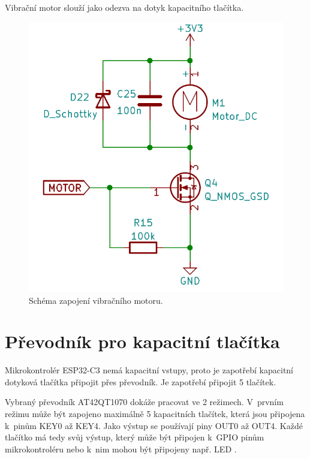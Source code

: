 Vibrační motor slouží jako odezva na dotyk kapacitního tlačítka. 

\begin{figure}[!h]
  \begin{center}
    \includegraphics[scale=0.4]{obrazky/Vibracni_motor.png}
  \end{center}
  \caption[Schéma zapojení vibračního motoru]{Schéma zapojení vibračního motoru.}
\end{figure}

\section{Převodník pro kapacitní tlačítka}
Mikrokontrolér ESP32-C3 nemá kapacitní vstupy, proto je zapotřebí kapacitní dotyková tlačítka připojit přes převodník. Je zapotřebí připojit 
5 tlačítek. 

Vybraný převodník AT42QT1070 dokáže pracovat ve 2 režimech. V~prvním režimu může být zapojeno maximálně 5 kapacitních tlačítek, která jsou připojena
k~pinům KEY0 až KEY4. Jako výstup se používají piny OUT0 až OUT4. Každé tlačítko má tedy svůj výstup, který může být připojen k~GPIO pinům mikrokontroléru
nebo k~nim mohou být připojeny např. LED \cite{conv_cap_but_AT42QT1070_dtsh}. 


